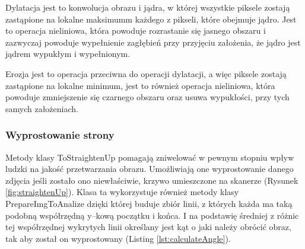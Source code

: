 \documentclass[a4paper,12pt]{article}
\newcommand\spacingIndent{2.2em}
\begin{document}
		        Dylatacja jest to konwolucja obrazu i jądra, w której wszystkie piksele zostają zastąpione na lokalne maksimumm każdego z pikseli, które obejmuje jądro. Jest to operacja nieliniowa, która powoduje rozrastanie się jasnego obszaru i zazwyczaj powoduje wypełnienie zagłębień przy przyjęciu założenia, że jądro jest jądrem wypukłym i wypełnionym. 
		        
    		    Erozja jest to operacja przeciwna do operacji dylatacji, a więc piksele zostają zastąpione na lokalne minimum, jest to również operacja nieliniowa, która powoduje zmniejszenie się czarnego obszaru oraz usuwa wypukłości, przy tych samych założeniach.
		    
		\subsubsection{Wyprostowanie strony}		
		    \hspace{\spacingIndent} 
		    Metody klasy ToStraightenUp pomagają zniwelować w pewnym stopniu wpływ      ludzki na jakość przetwarzania obrazu. Umożliwiają one wyprostowanie        danego zdjęcia jeśli zostało ono niewłaściwie, krzywo umieszczone na      skanerze (Rysunek \ref{fig:straightenUp}). Klasa ta wykorzystuje również metody klasy PrepareImgToAnalize     dzięki której buduje zbiór linii, z których każda ma taką podobną           współrzędną y--kową początku i końca. I na podstawię średniej z różnic     tej współrzędnej wykrytych linii określany jest kąt o jaki należy        obrócić obraz, tak aby został on wyprostowany (Listing \ref{lst:calculateAngle}).  
		
\end{document}
